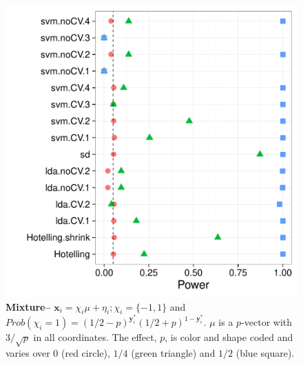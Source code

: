 \documentclass[12pt,a4paper]{article}
\theoremstyle{definition}
\newcommand{\set}[1]{\{ #1 \}} %
\newcommand{\prob}[1]{Prob( #1 )} %
\newcommand{\rv}[1]{\mathbf{#1}} %
\newcommand{\x}{\rv x} %
\newcommand{\y}{\rv y} %
\begin{document}
\begin{figure}[ht]
\centering
	  \includegraphics[width=0.7\linewidth]{"art/2016-08-08 07:33:05"}
	  \caption{\textbf{Mixture--} $\x_i = \chi_i \mu + \eta_i; \chi_i = \set{-1,1}$ and $\prob{\chi_i=1}=(1/2-p)^{\y^*_i}  (1/2+p)^{1-\y^*_i}$. $\mu$ is a $p$-vector with $3/\sqrt{p}$ in all coordinates.
	  The effect, $p$, is color and shape coded and varies over $0$ (red circle), $1/4$ (green triangle) and $1/2$ (blue square). }
	\label{fig:golland}
\end{figure}




\end{document}

